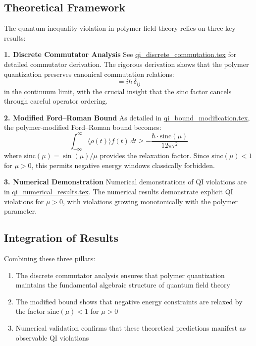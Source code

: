 \documentclass[12pt]{article}
\begin{document}
\subsection{Theoretical Framework}

The quantum inequality violation in polymer field theory relies on three key results:

\textbf{1. Discrete Commutator Analysis}
See \href{file:qi_discrete_commutation.tex}{qi\_discrete\_commutation.tex} for detailed commutator derivation. The rigorous derivation shows that the polymer quantization preserves canonical commutation relations:
\begin{equation}
[\hat{\phi}_i, \hat{\pi}_j^{\text{poly}}] = i\hbar\,\delta_{ij}
\end{equation}
in the continuum limit, with the crucial insight that the sinc factor cancels through careful operator ordering.

\textbf{2. Modified Ford–Roman Bound}
As detailed in \href{file:qi_bound_modification.tex}{qi\_bound\_modification.tex}, the polymer-modified Ford–Roman bound becomes:
\begin{equation}
\int_{-\infty}^{\infty} \langle\rho(t)\rangle f(t) \, dt \geq -\frac{\hbar \cdot \text{sinc}(\mu)}{12\pi\tau^2}
\end{equation}
where $\text{sinc}(\mu) = \sin(\mu)/\mu$ provides the relaxation factor. Since $\text{sinc}(\mu) < 1$ for $\mu > 0$, this permits negative energy windows classically forbidden.

\textbf{3. Numerical Demonstration}
Numerical demonstrations of QI violations are in \href{file:qi_numerical_results.tex}{qi\_numerical\_results.tex}. The numerical results demonstrate explicit QI violations for $\mu > 0$, with violations growing monotonically with the polymer parameter.

\subsection{Integration of Results}

Combining these three pillars:
\begin{enumerate}
\item The discrete commutator analysis ensures that polymer quantization maintains the fundamental algebraic structure of quantum field theory
\item The modified bound shows that negative energy constraints are relaxed by the factor $\text{sinc}(\mu) < 1$ for $\mu > 0$
\item Numerical validation confirms that these theoretical predictions manifest as observable QI violations
\end{enumerate}
\end{document}
